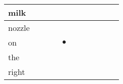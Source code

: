 \documentclass[landscape]{article}
\newcommand{\ssp}{\hspace{2pt}}
\newcommand{\mex}{\cellcolor{g}$\bullet$}
\begin{document}
\begin{tabular}{|l|p{10pt}|p{10pt}|p{10pt}|p{10pt}|p{10pt}|p{10pt}|p{10pt}|p{10pt}|p{10pt}|p{10pt}|}
\hline
\ssp milk \ssp&\hspace{2pt}&\hspace{2pt}&\hspace{2pt}&\hspace{2pt}&\hspace{2pt}&\hspace{2pt}&\hspace{2pt}&\hspace{2pt}&\hspace{2pt}&\hspace{2pt}\\
\hline
\ssp nozzle \ssp&\hspace{2pt}&\hspace{2pt}&\hspace{2pt}&\hspace{2pt}&\hspace{2pt}&\hspace{2pt}&\hspace{2pt}&\hspace{2pt}&\hspace{2pt}&\hspace{2pt}\\
\hline
\ssp \cellcolor{ref3}on \ssp&\hspace{2pt}&\hspace{2pt}&\hspace{2pt}&\hspace{2pt}\mex&\hspace{2pt}&\hspace{2pt}&\hspace{2pt}&\hspace{2pt}&\hspace{2pt}&\hspace{2pt}\\
\hline
\ssp the \ssp&\hspace{2pt}&\hspace{2pt}&\hspace{2pt}&\hspace{2pt}&\hspace{2pt}&\hspace{2pt}&\hspace{2pt}&\hspace{2pt}&\hspace{2pt}&\hspace{2pt}\\
\hline
\ssp right \ssp&\hspace{2pt}&\hspace{2pt}&\hspace{2pt}&\hspace{2pt}&\hspace{2pt}&\hspace{2pt}&\hspace{2pt}&\hspace{2pt}&\hspace{2pt}&\hspace{2pt}\\

\end{tabular}
\end{document}
